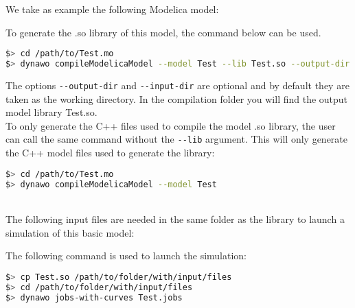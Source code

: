 \documentclass[a4paper, 12pt]{report}
\begin{document}
We take as example the following Modelica model:

To generate the .so library of this model, the command below can be
used. \\

\begin{lstlisting}[language=bash,deletekeywords={jobs,help}]
$> cd /path/to/Test.mo
$> dynawo compileModelicaModel --model Test --lib Test.so --output-dir compilation --input-dir .
\end{lstlisting}

The options \lstinline[language=bash]{--output-dir} and \lstinline[language=bash]{--input-dir} are optional and by default they are taken as the working directory. In the compilation folder you will find the output model library Test.so. \\

To only generate the C++ files used to compile the model .so library, the user can call the same command without the \lstinline[language=bash]{--lib} argument.
This will only generate the C++ model files used to generate the library:
\begin{lstlisting}[language=bash,deletekeywords={jobs,help}]
$> cd /path/to/Test.mo
$> dynawo compileModelicaModel --model Test
\end{lstlisting}

~~\\
The following input files are needed in the same folder as the library to launch a \Dynawo simulation of this basic model:






The following command is used to launch the simulation:
\begin{lstlisting}[language=bash,deletekeywords={jobs,help}]
$> cp Test.so /path/to/folder/with/input/files
$> cd /path/to/folder/with/input/files
$> dynawo jobs-with-curves Test.jobs
\end{lstlisting}
\end{document}
